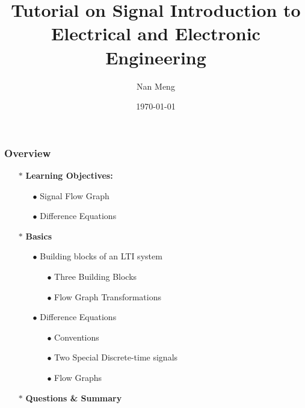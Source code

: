 \documentclass{beamer}
\title[Circuit(ENGG 1203)]{Tutorial on Signal \newline Introduction to Electrical and Electronic Engineering} %
\author{Nan Meng} %
\institute[Imaging Systems Laboratory] %
{
  University of Hong Kong \\ %
  \medskip
  \textit{u3003637@connect.hku.hk} %
}
\date{\today} %
\begin{document}
\begin{frame}
  \titlepage %
\end{frame}

\begin{frame}
\frametitle{Overview} %

\begin{itemize} \itemsep1pt \parskip0pt 
  \item[$\ast$] {\bf Learning Objectives:}
  \begin{itemize} \itemsep1pt \parskip0pt 
    \item[$\bullet$] Signal Flow Graph
    \item[$\bullet$] Difference Equations
  \end{itemize}
  \item[$\ast$] {\bf Basics}
  \begin{itemize} \itemsep1pt \parskip0pt 
    \item[$\bullet$] Building blocks of an LTI system
    \begin{itemize} \itemsep1pt \parskip0pt 
      \item[$\bullet$] Three Building Blocks
      \item[$\bullet$] Flow Graph Transformations
    \end{itemize}
    \item[$\bullet$] Difference Equations
    \begin{itemize} \itemsep1pt \parskip0pt 
      \item[$\bullet$] Conventions
      \item[$\bullet$] Two Special Discrete-time signals
      \item[$\bullet$] Flow Graphs
    \end{itemize}
  \end{itemize}
  \item[$\ast$] {\bf Questions \& Summary}
\end{itemize}
\end{frame}



\end{document}
